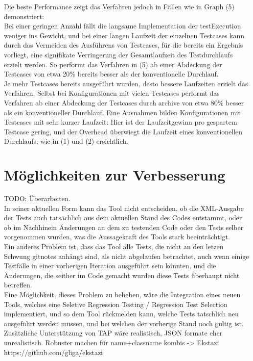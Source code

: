 Die beste Performance zeigt das Verfahren jedoch in Fällen wie in Graph (5) demonstriert:\\
Bei einer geringen Anzahl fällt die langsame Implementation der testExecution weniger ins Gewicht, und bei einer langen Laufzeit der einzelnen Testcases kann durch das Vermeiden des Ausführens von Testcases, für die bereits ein Ergebnis vorliegt, eine signifikate Verringerung der Gesamtlaufzeit des Testdurchlaufs erzielt werden. So performt das Verfahren in (5) ab einer Abdeckung der Testcases von etwa 20\% bereits besser als der konventionelle Durchlauf.\\
Je mehr Testcases bereits ausgeführt wurden, desto bessere Laufzeiten erzielt das Verfahren. Selbst bei Konfigurationen mit vielen Testcases performt das Verfahren ab einer Abdeckung der Testcases durch archive von etwa 80\% besser als ein konventioneller Durchlauf. Eine Ausnahmen bilden Konfigurationen mit Testcases mit sehr kurzer Laufzeit: Hier ist der Laufzeitgewinn pro gespartem Testcase gering, und der Overhead überwiegt die Laufzeit eines konventionellen Durchlaufs, wie in (1) und (2) ersichtlich. 


\section{Möglichkeiten zur Verbesserung}
TODO: Überarbeiten.\\
In seiner aktuellen Form kann das Tool nicht entscheiden, ob die XML-Ausgabe der Tests auch tatsächlich aus dem aktuellen Stand des Codes entstammt, oder ob im Nachhinein Änderungen an dem zu testenden Code oder den Tests selber vorgenommen wurden, was die Aussagekraft des Tools stark beeinträchtigt.\\
Ein anderes Problem ist, dass das Tool alle Tests, die nicht an den letzen Schwung gitnotes anhängt sind, als nicht abgelaufen betrachtet, auch wenn einige Testfälle in einer vorherigen Iteration ausgeführt sein könnten, und die Änderungen, die seither im Code gemacht wurden diese Tests überhaupt nicht betreffen.\\
Eine Möglichkeit, dieses Problem zu beheben, wäre die Integration eines neuen Tools, welches eine Seletive Regression Testing / Regression Test Selection implementiert, und so dem Tool rückmelden kann, welche Tests tatschlich neu ausgeführt werden müssen, und bei welchen der vorherige Stand noch gültig ist.\\
Zusätzliche Unterstützung von TAP wäre realistisch, JSON formate eher unrealistisch.
Robuster machen für name+classname kombis
-> Ekstazi
https://github.com/gliga/ekstazi
